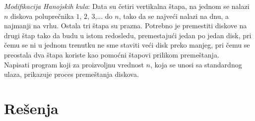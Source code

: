 \begin{Exercise}[label=118]%
{\em Modifikacija Hanojskih kula}: Data su četiri
  vertikalna štapa, na jednom se nalazi $n$ diskova poluprečnika
  $1$, $2$, $3$,... do $n$, tako da se najveći nalazi na dnu, a
  najmanji na vrhu. Ostala tri štapa su prazna. Potrebno je
  premestiti diskove na drugi štap tako da budu u istom redosledu,
  premestajući jedan po jedan disk, pri čemu se ni u jednom
  trenutku ne sme staviti veći disk preko manjeg, pri čemu se
  preostala dva štapa koriste kao pomoćni štapovi prilikom
  premeštanja.\\
  Napisati program koji za proizvoljnu vrednost $n$, koja se unosi sa standardnog ulaza, prikazuje proces premeštanja diskova.

\end{Exercise}



\section{Rešenja}
\shipoutAnswer
